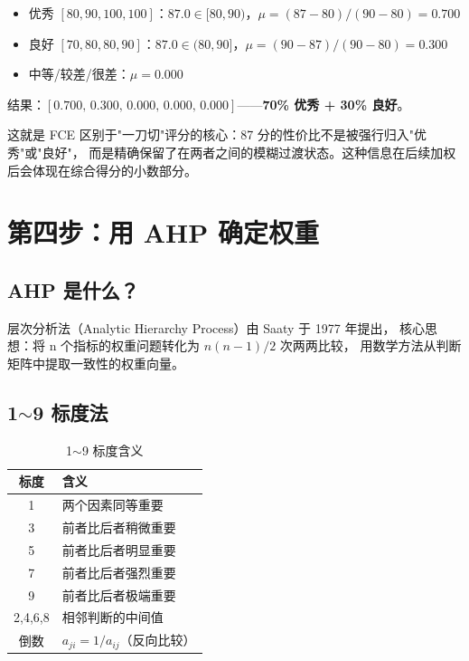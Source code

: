 \documentclass[a4paper,11pt]{ctexart}
\begin{document}
\begin{itemize}
    \item 优秀 $[80,90,100,100]$：$87.0 \in [80,90)$，$\mu = (87-80)/(90-80) = \mathbf{0.700}$
    \item 良好 $[70,80,80,90]$：$87.0 \in (80,90]$，$\mu = (90-87)/(90-80) = \mathbf{0.300}$
    \item 中等/较差/很差：$\mu = 0.000$
\end{itemize}

结果：$[0.700,\, 0.300,\, 0.000,\, 0.000,\, 0.000]$——\textbf{70\% 优秀 + 30\% 良好}。

\begin{keybox}
这就是 FCE 区别于"一刀切"评分的核心：87 分的性价比不是被强行归入"优秀"或"良好"，
而是精确保留了在两者之间的模糊过渡状态。这种信息在后续加权后会体现在综合得分的小数部分。
\end{keybox}

\section{第四步：用 AHP 确定权重}

\subsection{AHP 是什么？}

层次分析法（Analytic Hierarchy Process）由 Saaty 于 1977 年提出，
核心思想：将 n 个指标的权重问题转化为 $n(n-1)/2$ 次两两比较，
用数学方法从判断矩阵中提取一致性的权重向量。

\subsection{1$\sim$9 标度法}

\begin{table}[H]
\centering
\caption{1$\sim$9 标度含义}
\begin{tabular}{cl}
\toprule
\textbf{标度} & \textbf{含义} \\
\midrule
1 & 两个因素同等重要 \\
3 & 前者比后者稍微重要 \\
5 & 前者比后者明显重要 \\
7 & 前者比后者强烈重要 \\
9 & 前者比后者极端重要 \\
2,4,6,8 & 相邻判断的中间值 \\
倒数 & $a_{ji} = 1/a_{ij}$（反向比较） \\
\bottomrule
\end{tabular}
\end{table}
\end{document}
